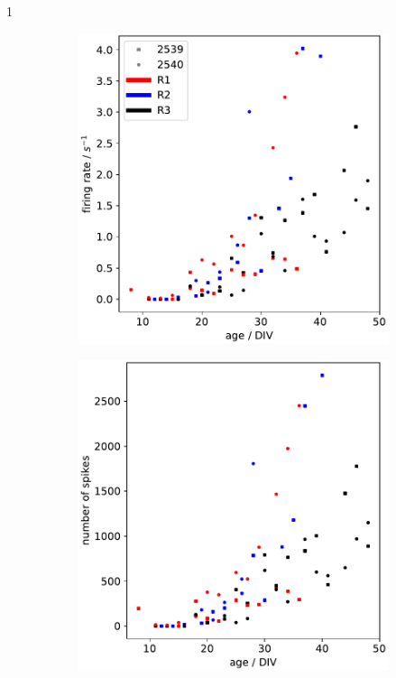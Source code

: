 1\documentclass[11pt]{article}
\begin{document}
{\begin{figure}
	\centering
\begin{subfigure}[b]{0.45\textwidth}
	\centering
	\includegraphics[width=\textwidth]{../plots/development_plots_fr.pdf}
\end{subfigure}
\hfill
\begin{subfigure}[b]{0.45\textwidth}
	\centering
	\includegraphics[width=\textwidth]{../plots/development_plots_n.pdf}
\end{subfigure}


\end{figure}}
\end{document}
